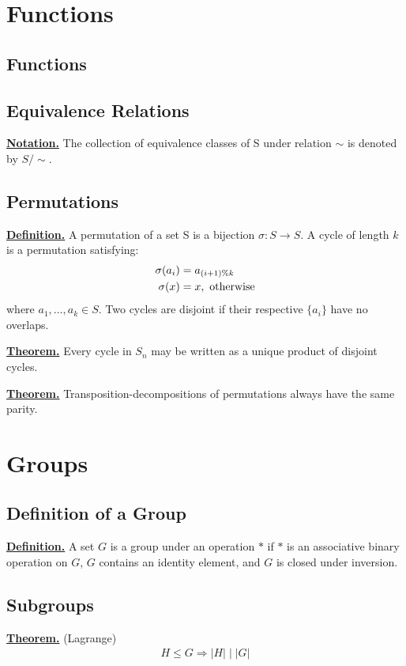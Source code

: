 \documentclass{article}
\renewcommand\({\left(}
\renewcommand\){\right)}
\begin{document}
\section{Functions}
\subsection{Functions}
\subsection{Equivalence Relations}
\underline{\textbf{Notation.}} The collection of equivalence classes of S under relation $\sim$ is denoted by $S/\sim$.

\vspace{24mm}
\subsection{Permutations}
\underline{\textbf{Definition.}} A permutation of a set S is a bijection $\sigma: S\rightarrow S$. A cycle of length $k$ is a permutation satisfying:
\begin{align*}
    \sigma(a_i)&=a_{(i+1)\%k}\\
    \sigma(x)&=x, \textnormal{   otherwise}
\end{align*}
where $a_1, \dots, a_k\in S$. Two cycles are disjoint if their respective $\{a_i\}$ have no overlaps.

\vspace{6mm}
\underline{\textbf{Theorem.}} Every cycle in $S_n$ may be written as a unique product of disjoint cycles.

\vspace{6mm}
\underline{\textbf{Theorem.}} Transposition-decompositions of permutations always have the same parity.
\newpage

\section{Groups}
\subsection{Definition of a Group}
\underline{\textbf{Definition.}} A set $G$ is a group under an operation $*$ if $*$ is an associative binary operation on $G$, $G$ contains an identity element, and $G$ is closed under inversion.
\subsection{Subgroups}
\underline{\textbf{Theorem.}} (Lagrange) 
\begin{align*}
    H\leq G\Rightarrow|H|\mid|G|
\end{align*}
\end{document}

